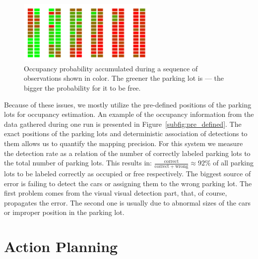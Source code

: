 \begin{figure}[t]
    \begin{center}
        \includegraphics[width=0.6\textwidth]{pictures/parking_lots.png}
    \end{center}
    \caption{Occupancy probability accumulated during a sequence of observations shown in color. The greener the parking lot is --- the bigger the probability for it to be free.}
    \label{fig:occupancy_accumulated}
\end{figure}

Because of these issues, we mostly utilize the pre-defined positions of the
parking lots for occupancy estimation. An example of the occupancy information
from the data gathered during one run is presented in
Figure~\ref{subfig:pre_defined}. The exact positions of the parking lots and
deterministic association of detections to them allows us to quantify the
mapping precision. For this system we measure the detection rate as a relation
of the number of correctly labeled parking lots to the total number of parking
lots. This results in: $\frac{\mathrm{correct}}{\mathrm{correct} +
\mathrm{wrong}} \approx 92\% $ of all parking lots to be labeled correctly as
occupied or free respectively. The biggest source of error is failing to
detect the cars or assigning them to the wrong parking lot. The first problem
comes from the visual visual detection part, that, of course, propagates the
error. The second one is usually due to abnormal sizes of the cars or improper
position in the parking lot.



\section{Action Planning}
\label{sec:planning_results}


